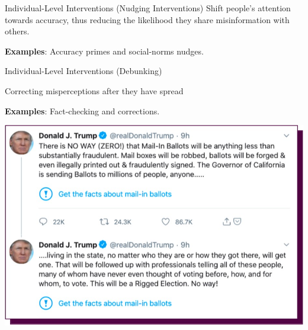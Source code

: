 \documentclass[nobackground,dvipsnames,table]{beamer}
\begin{document}
\begin{frame}{Individual-Level Interventions
(Nudging Interventions)}
Shift people’s attention towards accuracy, thus reducing the likelihood they share misinformation with others.

\textbf{Examples}: Accuracy primes and social-norms nudges.
    
\end{frame}


\begin{frame}{Individual-Level Interventions
(Debunking)}
\begin{minipage}{0.37\textwidth}
    \raggedright{
    \footnotesize{
        Correcting misperceptions after they have spread \newline 

        \textbf{Examples}: Fact-checking and corrections.
    }}
\end{minipage}
\hspace{0.02\textwidth}
\begin{minipage}{0.58\textwidth}
    \includegraphics[width=\textwidth]{img/fig8.jpg}
\end{minipage}
    
\end{frame}
\end{document}
